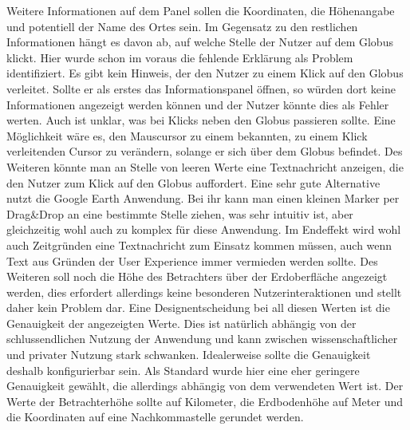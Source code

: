 Weitere Informationen auf dem Panel sollen die Koordinaten, die Höhenangabe und potentiell der Name des Ortes sein. Im Gegensatz zu den restlichen Informationen hängt es davon ab, auf welche Stelle der Nutzer auf dem Globus klickt. Hier wurde schon im voraus die fehlende Erklärung als Problem identifiziert. Es gibt kein Hinweis, der den Nutzer zu einem Klick auf den Globus verleitet. Sollte er als erstes das Informationspanel öffnen, so würden dort keine Informationen angezeigt werden können und der Nutzer könnte dies als Fehler werten. Auch ist unklar, was bei Klicks neben den Globus passieren sollte. Eine Möglichkeit wäre es, den Mauscursor zu einem bekannten, zu einem Klick verleitenden Cursor zu verändern, solange er sich über dem Globus befindet. Des Weiteren könnte man an Stelle von leeren Werte eine Textnachricht anzeigen, die den Nutzer zum Klick auf den Globus auffordert. Eine sehr gute Alternative nutzt die Google Earth Anwendung. Bei ihr kann man einen kleinen Marker per Drag\&Drop an eine bestimmte Stelle ziehen, was sehr intuitiv ist, aber gleichzeitig wohl auch zu komplex für diese Anwendung. Im Endeffekt wird wohl auch Zeitgründen eine Textnachricht zum Einsatz kommen müssen, auch wenn Text aus Gründen der User Experience immer vermieden werden sollte. Des Weiteren soll noch die Höhe des Betrachters über der Erdoberfläche angezeigt werden, dies erfordert allerdings keine besonderen Nutzerinteraktionen und stellt daher kein Problem dar. Eine Designentscheidung bei all diesen Werten ist die Genauigkeit der angezeigten Werte. Dies ist natürlich abhängig von der schlussendlichen Nutzung der Anwendung und kann zwischen wissenschaftlicher und privater Nutzung stark schwanken. Idealerweise sollte die Genauigkeit deshalb konfigurierbar sein. Als Standard wurde hier eine eher geringere Genauigkeit gewählt, die allerdings abhängig von dem verwendeten Wert ist. Der Werte der Betrachterhöhe sollte auf Kilometer, die Erdbodenhöhe auf Meter und die Koordinaten auf eine Nachkommastelle gerundet werden.

